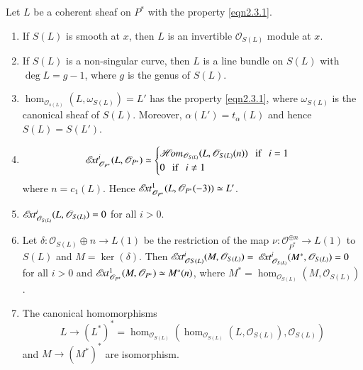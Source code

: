 \begin{Prop}\label{Prop2.9}
Let $L$ be a coherent sheaf on $P^{\ast}$ with the property
\eqref{eqn2.3.1}.
\begin{enumerate}
\renewcommand{\labelenumi}{(\theenumi)}
\item If $S(L)$ is smooth at $x$, then $L$ is an invertible
  $\mathscr{O}_{S(L)}$ module at $x$.
\item If $S(L)$ is a non-singular curve, then $L$ is a line bundle on
  $S(L)$ with $\deg L=g-1$, where $g$ is the genus of $S(L)$. 
\item $\hom_{\mathscr{O}_{s(L)}}(L,\omega_{S(L)})=L'$ has the property
  \eqref{eqn2.3.1}, where $\omega_{S(L)}$ is the canonical sheaf of
  $S(L)$. Moreover, $\alpha(L')=t_{\alpha}(L)$ and hence $S(L)=S(L')$.

\item \begin{equation*}
\mathscr{E}\!{\it xt}^{i}_{\mathscr{O}_{P^{\ast}}}(L,\mathscr{O}_{P^{\ast}})\simeq
\begin{cases}
\mathscr{H}\!{\it om}_{\mathscr{O}_{S(L)}}(L,\mathscr{O}_{S(L)}(n)) \text{~~ if~~ } i=1\\
0\text{~~ if~~ } i\neq 1
\end{cases}
\end{equation*}\pageoriginale
where $n=c_1(L)$. Hence
$\mathscr{E}\!{\it xt}^{1}_{\mathscr{O}_{P^{\ast}}}(L,\mathscr{O}_{P^{\ast}}(-3))\simeq
L'$.

\item $\mathscr{E}\!{\it xt}^{i}_{\mathscr{O}_{S(L)}} (L,\mathscr{O}_{S(L)})=0$ for all
  $i>0$.

\item Let $\delta:\mathscr{O}_{S(L)}\oplus n\to L(1)$ be the
  restriction of the map $\nu:\mathscr{O}_{P^{\ast}}^{\oplus n}\to
  L(1)$ to $S(L)$ and $M=\ker(\delta)$. Then
  $\mathscr{E}\!{\it xt}^{i}_{\mathscr{O}S(L)}(M,\mathscr{O}_{S(L)})=$
  $\mathscr{E}\!{\it xt}^{i}_{\mathscr{O}_{S(L)}}(M^{\ast},\mathscr{O}_{S(L)})=0$ for
  all $i>0$ and
  $\mathscr{E}\!{\it xt}^{1}_{\mathscr{O}_{P^{\ast}}}(M,\mathscr{O}_{P^{\ast}})\simeq
      M^{\ast}(n)$, where
      $M^{\ast}=\hom_{\mathscr{O}_{S(L)}}(M,\mathscr{O}_{S(L)})$.

\item The canonical homomorphisms 
$$
L\to (L^{\ast})^{\ast}=
  \hom_{\mathscr{O}_{S(L)}}
  (\hom_{\mathscr{O}_{S(L)}}(L,\mathscr{O}_{S(L)}),\mathscr{O}_{S(L)})
$$ 
and $M\to  (M^{\ast})^{\ast}$ are isomorphism.
\end{enumerate}
\end{Prop}


